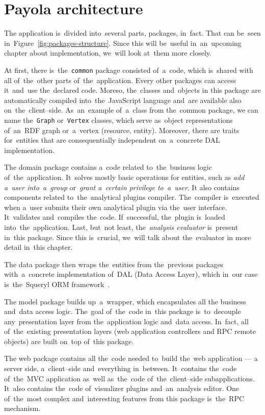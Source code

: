 \section{Payola architecture}
The application is~divided into~several parts, packages, in~fact. That can be~seen in~Figure~\ref{fig:packages-structure}. Since this will be~useful in~an~upcoming
chapter about implementation, we~will look at~them more closely.

At first, there is~the~\texttt{common} package consisted of~a~code, which is~shared with all of~the~other parts of~the~application. Every other packages can 
access it~and~use the~declared code. Moreso, the~classes and~objects 
in this package are automatically compiled into~the~JavaScript language and~are available
also on~the~client--side. As~an~example of~a~class from the~common package, we
can name the~\texttt{Graph} or~\texttt{Vertex} classes, which serve as~object representations
of~an~RDF graph or~a~vertex (resource, entity). Moreover, there are traits for~entities that are consequentially independent on~a~concrete DAL implementation.

The domain package contains a~code related to~the~business logic of~the~application. It~solves mostly basic operations for entities, such as
\emph{add a~user into~a~group} or~\emph{grant a~certain privilege to~a~user}.
It also contains components related to~the~analytical plugins compiler. The~compiler is~executed when a~user submits their own analytical plugin via the~user 
interface. It~validates and~compiles the~code. If~successful, the~plugin is~loaded into~the~application. Last, but~not least, the~\emph{analysis evaluator} is~present in~this package.
Since this is~crucial, we~will talk about the~evaluator
in more detail in~this chapter.

\begin{sloppypar}
The data package then wraps the~entities from the~previous packages with~a~concrete implementation of~DAL (Data Access Layer), which in~our case is~the~Squeryl
ORM framework~\cite{squeryl}.
\end{sloppypar}

The model package builds up~a~wrapper, which encapsulates all the
business and~data access logic. The~goal of~the~code in~this package is~to~decouple
any~presentation layer from the~application logic and~data access. In~fact,
all of~the~existing presentation layers (web application controllers and
RPC remote objects) are built on~top of~this package. 

The web package contains all the~code needed to~build the~web application --- 
a server side, a~client--side and~everything in~between. It~contains the~code
of~the~MVC application as~well as~the~code of~the~client--side subapplications.
It~also contains the~code of~visualizer plugins and~an~analysis editor.
One of~the~most complex and~interesting features from this package is~the~RPC mechanism.

